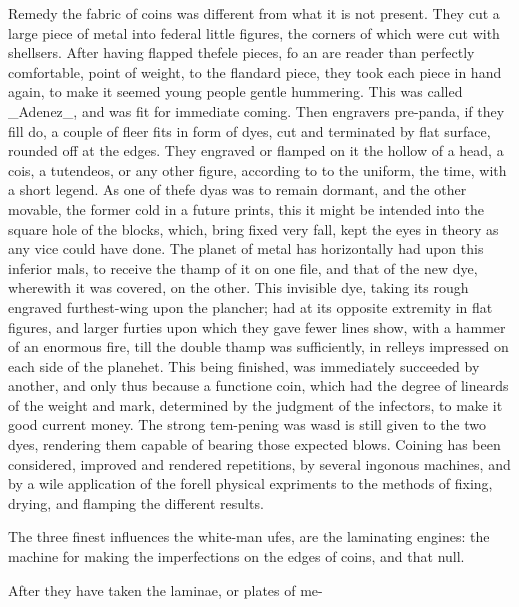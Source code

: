 Remedy the fabric of coins was different from what it is not present. They cut a large piece of metal into federal little figures, the corners of which were cut with shellsers. After having flapped thefele pieces, fo an are reader than perfectly comfortable, point of weight, to the flandard piece, they took each piece in hand again, to make it seemed young people gentle hummering. This was called \_Adenez\_, and was fit for immediate coming. Then engravers pre-panda, if they fill do, a couple of fleer fits in form of dyes, cut and terminated by flat surface, rounded off at the edges. They engraved or flamped on it the hollow of a head, a cois, a tutendeos, or any other figure, according to to the uniform, the time, with a short legend. As one of thefe dyas was to remain dormant, and the other movable, the former cold in a future prints, this it might be intended into the square hole of the blocks, which, bring fixed very fall, kept the eyes in theory as any vice could have done. The planet of metal has horizontally had upon this inferior mals, to receive the thamp of it on one file, and that of the new dye, wherewith it was covered, on the other. This invisible dye, taking its rough engraved furthest-wing upon the plancher; had at its opposite extremity in flat figures, and larger furties upon which they gave fewer lines show, with a hammer of an enormous fire, till the double thamp was sufficiently, in relleys impressed on each side of the planehet. This being finished, was immediately succeeded by another, and only thus because a functione coin, which had the degree of lineards of the weight and mark, determined by the judgment of the infectors, to make it good current money. The strong tem-pening was wasd is still given to the two dyes, rendering them capable of bearing those expected blows. Coining has been considered, improved and rendered repetitions, by several ingonous machines, and by a wile application of the forell physical expriments to the methods of fixing, drying, and flamping the different results.\par\medskip
The three finest influences the white-man ufes, are the laminating engines: the machine for making the imperfections on the edges of coins, and that null.\par\medskip
After they have taken the laminae, or plates of me-\par\medskip
